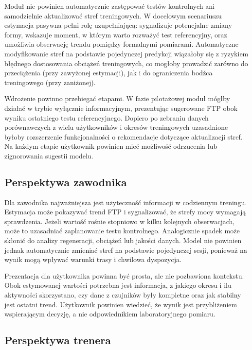 Moduł nie powinien automatycznie zastępować testów kontrolnych ani samodzielnie aktualizować stref treningowych. W docelowym scenariuszu estymacja pasywna pełni rolę uzupełniającą: sygnalizuje potencjalne zmiany formy, wskazuje moment, w którym warto rozważyć test referencyjny, oraz umożliwia obserwację trendu pomiędzy formalnymi pomiarami. Automatyczne modyfikowanie stref na podstawie pojedynczej predykcji wiązałoby się z ryzykiem błędnego dostosowania obciążeń treningowych, co mogłoby prowadzić zarówno do przeciążenia (przy zawyżonej estymacji), jak i do ograniczenia bodźca treningowego (przy zaniżonej).

Wdrożenie powinno przebiegać etapami. W fazie pilotażowej moduł mógłby działać w trybie wyłącznie informacyjnym, prezentując sugerowane FTP obok wyniku ostatniego testu referencyjnego. Dopiero po zebraniu danych porównawczych z wielu użytkowników i okresów treningowych uzasadnione byłoby rozszerzenie funkcjonalności o rekomendacje dotyczące aktualizacji stref. Na każdym etapie użytkownik powinien mieć możliwość odrzucenia lub zignorowania sugestii modelu.

\subsection{Perspektywa zawodnika}

Dla zawodnika najważniejsza jest użyteczność informacji w codziennym treningu. Estymacja może pokazywać trend FTP i sygnalizować, że strefy mocy wymagają sprawdzenia. Jeżeli wartość rośnie stopniowo w kilku kolejnych obserwacjach, może to uzasadniać zaplanowanie testu kontrolnego. Analogicznie spadek może skłonić do analizy regeneracji, obciążeń lub jakości danych. Model nie powinien jednak automatycznie zmieniać stref na podstawie pojedynczej sesji, ponieważ na wynik mogą wpływać warunki trasy i chwilowa dyspozycja.

Prezentacja dla użytkownika powinna być prosta, ale nie pozbawiona kontekstu. Obok estymowanej wartości potrzebna jest informacja, z jakiego okresu i ilu aktywności skorzystano, czy dane z czujników były kompletne oraz jak stabilny jest ostatni trend. Użytkownik powinien wiedzieć, że wynik jest przybliżeniem wspierającym decyzję, a nie odpowiednikiem laboratoryjnego pomiaru.

\subsection{Perspektywa trenera}

